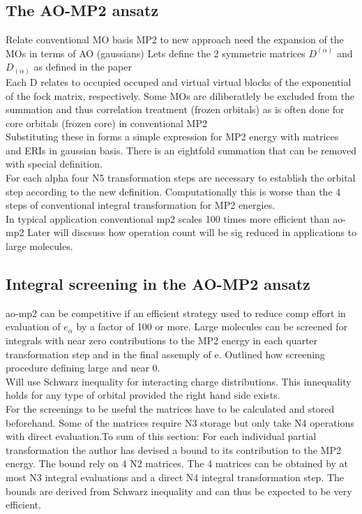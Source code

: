 \documentclass[10pt, draft]{article}
\begin{document}
\subsection{The AO-MP2 ansatz}
Relate conventional MO basis MP2 to new approach need the expansion of the MOs in terms of AO (gaussians)
Lets define the 2 symmetric matrices $D^{(\alpha)}$ and $D_{(\alpha)}$ as defined in the paper\\
Each D relates to occupied occuped and virtual virtual blocks of the exponential of the fock matrix, respectively.  Some MOs are diliberatlely be excluded from the summation and thus correlation treatment (frozen orbitals) as is often done for core orbitals (frozen core) in conventional MP2\\
Substituting these in forms a simple expression for MP2 energy with matrices and ERIs in gaussian basis.  There is an eightfold summation that can be removed with special definition.\\
For each alpha four N5 transformation steps are necessary to establish the orbital step according to the new definition.  Computationally this is worse than the 4 steps of conventional integral transformation for MP2 energies.\\
In typical application conventional mp2 scales 100 times more efficient than ao-mp2 Later will discsuss how operation count will be sig reduced in applications to large molecules.

\subsection{Integral screening in the AO-MP2 ansatz}
ao-mp2 can be competitive if an efficient strategy used to reduce comp effort in evaluation of $e_\alpha$ by a factor of 100 or more.  Large molecules can be screened for integrals with near zero contributions to the MP2 energy in each quarter transformation step and in the final assemply of e.  Outlined how screening procedure defining large and near 0.\\
Will use Schwarz inequality for interacting charge distributions. This innequality holds for any type of orbital provided the right hand side exists.\\
For the screenings to be useful the matrices have to be calculated and stored beforehand.  Some of the matrices require N3 storage but only take N4 operations with direct evaluation.\linebreak[1]
To sum of this section: For each individual partial transformation the author has devised a bound to its contribution to the MP2 energy.  The bound rely on 4 N2 matrices.  The 4 matrices can be obtained by at most N3 integral evaluations and a direct N4 integral transformation step.  The bounds are derived from Schwarz inequality and can thus be expected to be very efficient.  
\end{document}
